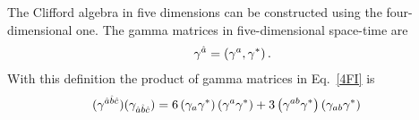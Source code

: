 \documentclass[twocolumn,showpacs,showkeys,prd,superscriptaddress]{revtex4-1}
\begin{document}
The Clifford algebra in five dimensions can be constructed using the four-dimensional one. %
The gamma matrices in five-dimensional space-time are
\begin{align}
  \gamma^{\hat{a}} = \left(\gamma^a,\gamma^*\right).
\end{align}
With this definition the product of gamma matrices in Eq.~\eqref{4FI} is 
\begin{align}
  (\gamma^{\hat{a}\hat{b}\hat{c}})(\gamma_{\hat{a}\hat{b}\hat{c}}) &= 6\left(\gamma_a\gamma^*\right)\left(\gamma^a\gamma^*\right) + 3\left(\gamma^{ab}\gamma^*\right)\left(\gamma_{ab}\gamma^*\right)
\end{align}

\end{document}
